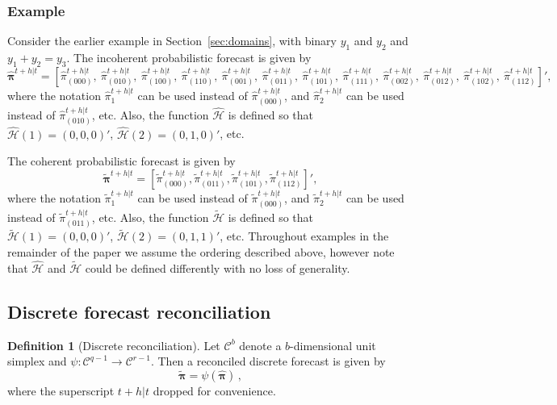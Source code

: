 \documentclass[a4paper,review,11pt,authoryear]{elsarticle}
\newcommand{\bpi}{\bm{\pi}}
\theoremstyle{definition}
\newtheorem{definition}{Definition}[section]
\begin{document}
  \subsubsection*{\textbf{Example}}

  Consider the earlier example in Section~\ref{sec:domains}, with binary $y_1$ and $y_2$ and $y_1+y_2=y_3$. The incoherent probabilistic forecast is given by
  \[
    \hat{\bpi}^{t+h|t}= \left[
      \hat{\pi}^{t+h|t}_{(000)}, ~
       \hat{\pi}^{t+h|t}_{(010)},~
       \hat{\pi}^{t+h|t}_{(100)},~
       \hat{\pi}^{t+h|t}_{(110)},~
       \hat{\pi}^{t+h|t}_{(001)},~
       \hat{\pi}^{t+h|t}_{(011)},~
       \hat{\pi}^{t+h|t}_{(101)},~
       \hat{\pi}^{t+h|t}_{(111)},~
       \hat{\pi}^{t+h|t}_{(002)},~
       \hat{\pi}^{t+h|t}_{(012)},~
       \hat{\pi}^{t+h|t}_{(102)},~
       \hat{\pi}^{t+h|t}_{(112)}
       \right]',
  \]
  where the notation $\hat{\pi}^{t+h|t}_{1}$ can be used instead of $\hat{\pi}^{t+h|t}_{(000)}$, and $\hat{\pi}^{t+h|t}_{2}$ can be used instead of $\hat{\pi}^{t+h|t}_{(010)}$, etc. Also, the function $\hat{\mathcal{H}}$ is defined so that $\hat{\mathcal{H}}(1)=(0,0,0)'$, $\hat{\mathcal{H}}(2)=(0,1,0)'$, etc.

  The coherent probabilistic forecast is given by
  \[
  \tilde{\bpi}^{t+h|t}=\left[
  \tilde{\pi}^{t+h|t}_{(000)},
  \tilde{\pi}^{t+h|t}_{(011)},
  \tilde{\pi}^{t+h|t}_{(101)},
  \tilde{\pi}^{t+h|t}_{(112)}
  \right]',\]
  where the notation $\tilde{\pi}^{t+h|t}_{1}$ can be used instead of $\tilde{\pi}^{t+h|t}_{(000)}$, and $\tilde{\pi}^{t+h|t}_{2}$ can be used instead of $\tilde{\pi}^{t+h|t}_{(011)}$, etc. Also, the function $\tilde{\mathcal{H}}$ is defined so that $\tilde{\mathcal{H}}(1)=(0,0,0)'$, $\tilde{\mathcal{H}}(2)=(0,1,1)'$, etc. Throughout examples in the remainder of the paper we assume the ordering described above, however note that $\hat{\mathcal{H}}$ and $\tilde{\mathcal{H}}$ could be defined differently with no loss of generality.

  \subsection{Discrete forecast reconciliation}\label{sec:discrec}
  
   \begin{definition}[Discrete reconciliation]
  	
  	Let $\mathcal{C}^{b}$ denote a $b$-dimensional unit simplex and $\psi:\mathcal{C}^{q-1} \rightarrow \mathcal{C}^{r-1}$.	Then a reconciled discrete forecast is given by 
  	\[
  	  \tilde{\bpi} = \psi(\hat{\bpi})\,,
  	\]
    where the superscript $t+h|t$ dropped for convenience.
   \end{definition}
    
\end{document}
